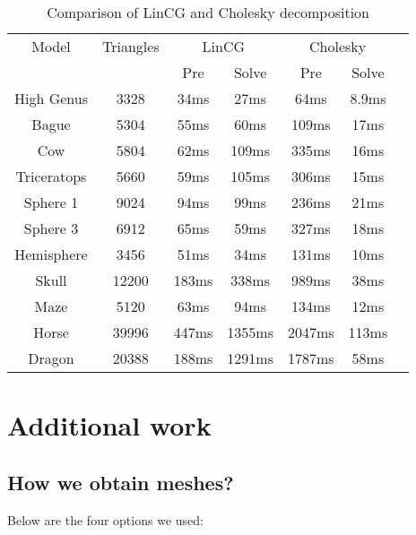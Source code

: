 \documentclass[a4paper,12pt,twoside]{article}
\begin{document}
\begin{table}[htb]
\centering
\begin{tabular}{|c|c|c|c|c|c|c|}
  \hline
  
  
  Model & Triangles & \multicolumn{2}{c|}{LinCG} & \multicolumn{2}{c|}{Cholesky} \\
  \cline{3-6}
  & & Pre & Solve & Pre & Solve \\
  \hline\hline
  
  High Genus & 3328 & 34ms & 27ms & 64ms & 8.9ms \\
  Bague & 5304 & 55ms & 60ms & 109ms & 17ms  \\
  Cow & 5804 & 62ms & 109ms & 335ms & 16ms \\
  Triceratops & 5660 & 59ms & 105ms & 306ms & 15ms \\
  Sphere 1 & 9024 & 94ms & 99ms & 236ms & 21ms \\
  Sphere 3 & 6912 & 65ms & 59ms & 327ms & 18ms \\
  Hemisphere & 3456 & 51ms & 34ms & 131ms & 10ms \\
  Skull & 12200 & 183ms & 338ms & 989ms & 38ms \\
  Maze & 5120 & 63ms & 94ms & 134ms & 12ms \\
  Horse & 39996 & 447ms & 1355ms & 2047ms & 113ms \\
  Dragon & 20388 & 188ms & 1291ms & 1787ms & 58ms \\
  \hline
\end{tabular}
\caption{Comparison of LinCG and Cholesky decomposition}
\end{table}

\section{Additional work}

\subsection{How we obtain meshes?}
Below are the four options we used:
\end{document}
